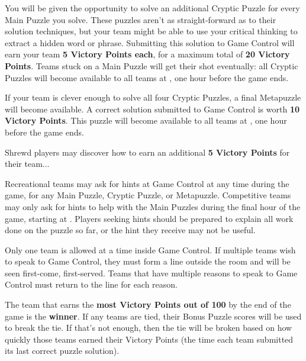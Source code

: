 \begin{multicols}{2}

You will be given the opportunity to solve an additional Cryptic Puzzle for
every Main Puzzle you solve. These puzzles aren't as straight-forward
as to their solution techniques, but your team might be able to use your
critical thinking to extract a hidden word or phrase. Submitting this
solution to Game Control will earn your team \textbf{5 Victory Points each},
for a maximum total of \textbf{20 Victory Points}.
Teams stuck on a Main Puzzle will get their shot eventually: all
Cryptic Puzzles will become available to all teams at \underline{\hspace{5em}},
one hour before the game ends.


If your team is clever enough to solve all four Cryptic Puzzles, a final
Metapuzzle will become available. A correct solution submitted to Game
Control is worth \textbf{10 Victory Points}. This puzzle will become available
to all teams at \underline{\hspace{5em}}, one hour before the game ends.


Shrewd players may discover how to earn an additional
\textbf{5 Victory Points} for their team...


Recreational teams may ask for hints at Game Control at any time during
the game, for any Main Puzzle, Cryptic Puzzle, or Metapuzzle.
Competitive teams may only ask for hints to help with
the Main Puzzles during the final hour of the game, starting at
\underline{\hspace{5em}}. Players seeking hints should be prepared to
explain all work done on the puzzle so far, or the hint they receive may not
be useful.

\columnbreak


Only one team is allowed at a time inside Game Control. If multiple teams
wish to speak to Game Control, they must form a line outside the room
and will be seen first-come, first-served. Teams that have multiple reasons
to speak to Game Control must return to the line for each reason.


The team that earns the \textbf{most Victory Points out of 100}
by the end of the game is the \textbf{winner}. If any teams are tied,
their Bonus Puzzle scores will be used to break the tie. If that's not enough,
then the tie will be broken based on how quickly those teams earned their
Victory Points (the time each team submitted its last correct puzzle solution).
\end{multicols}

